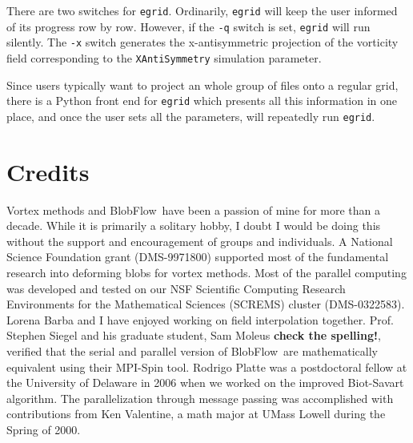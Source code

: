 \documentclass[12pt]{report}
\newcommand{\BF}{BlobFlow}
\begin{document}
There are two switches for {\tt egrid}.  Ordinarily, {\tt egrid}
will keep the user informed of its progress row by row.  However, if the
{\tt -q} switch is set, {\tt egrid} will run silently.  The {\tt -x}
switch generates the x-antisymmetric projection of the vorticity field
corresponding to the {\tt XAntiSymmetry} simulation parameter.

Since users typically want to project an whole group of files onto a regular
grid, there is a Python front end for {\tt egrid} which
presents all this information in one place, and once the user sets all the
parameters, will repeatedly run {\tt egrid}.

% 

\section{Credits}

Vortex methods and \BF~have been a passion of mine for more than a decade. 
While it is primarily a solitary hobby, I doubt I would be doing this without
the support and encouragement of groups and individuals.  A National Science
Foundation grant (DMS-9971800) supported most of the fundamental research into
deforming blobs for vortex methods.  Most of the parallel computing was
developed and tested on our NSF Scientific Computing Research Environments
for the Mathematical Sciences (SCREMS) cluster (DMS-0322583). Lorena Barba and I
have enjoyed working on field interpolation together.
Prof. Stephen Siegel and his graduate student, Sam Moleus {\bf check the
spelling!}, verified that the serial and parallel version of \BF~are
mathematically equivalent using their MPI-Spin tool. Rodrigo Platte was a
postdoctoral fellow at the University of Delaware in 2006 when we worked on the
improved Biot-Savart algorithm.  The parallelization through message passing was
accomplished with
contributions from Ken Valentine, a math major at UMass Lowell
during the Spring of 2000.



\end{document}
